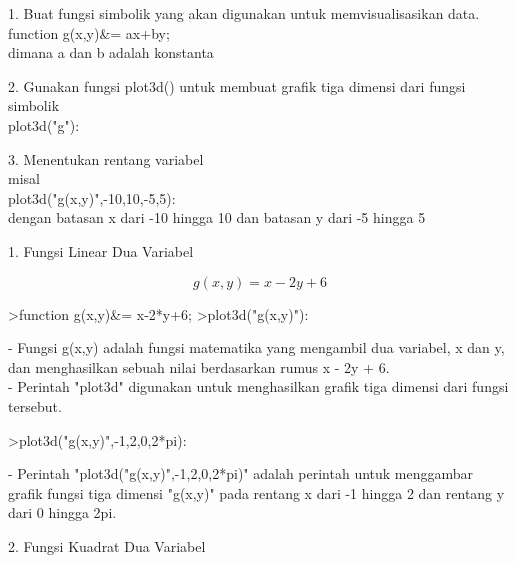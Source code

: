 \documentclass[a4paper,10pt]{article}
\begin{document}
\begin{eulernotebook}
\begin{eulercomment}
\begin{eulercomment}
\begin{eulercomment}
\begin{eulercomment}
\begin{eulercomment}
\begin{eulercomment}
\begin{eulercomment}
\begin{eulercomment}
\begin{eulercomment}
1. Buat fungsi simbolik yang akan digunakan untuk memvisualisasikan
data.\\
function g(x,y)\&= ax+by;\\
dimana a dan b adalah konstanta

2. Gunakan fungsi plot3d() untuk membuat grafik tiga dimensi dari
fungsi simbolik\\
plot3d("g"):

3. Menentukan rentang variabel\\
misal\\
plot3d("g(x,y)",-10,10,-5,5):\\
dengan batasan x dari -10 hingga 10 dan batasan y dari -5 hingga 5

\end{eulercomment}
\begin{eulercomment}
1. Fungsi Linear Dua Variabel

\end{eulercomment}
\begin{eulerformula}
\[
g(x,y)=x-2y+6
\]
\end{eulerformula}
\begin{eulercomment}
\end{eulercomment}
\begin{eulerprompt}
>function g(x,y)&= x-2*y+6;
>plot3d("g(x,y)"):
\end{eulerprompt}
\begin{eulercomment}
- Fungsi g(x,y) adalah fungsi matematika yang mengambil dua variabel,
x dan y, dan menghasilkan sebuah nilai berdasarkan rumus x - 2y + 6.\\
- Perintah "plot3d" digunakan untuk menghasilkan grafik tiga dimensi
dari fungsi tersebut.
\end{eulercomment}
\begin{eulerprompt}
>plot3d("g(x,y)",-1,2,0,2*pi):
\end{eulerprompt}
\begin{eulercomment}
- Perintah "plot3d("g(x,y)",-1,2,0,2*pi)" adalah perintah untuk
menggambar grafik fungsi tiga dimensi "g(x,y)" pada rentang x dari -1
hingga 2 dan rentang y dari 0 hingga 2pi.

\end{eulercomment}
\eulersubheading{}
\begin{eulercomment}
2. Fungsi Kuadrat Dua Variabel


\end{eulercomment}
\end{eulercomment}
\end{eulercomment}
\end{eulercomment}
\end{eulercomment}
\end{eulercomment}
\end{eulercomment}
\end{eulercomment}
\end{eulercomment}
\end{eulernotebook}
\end{document}
